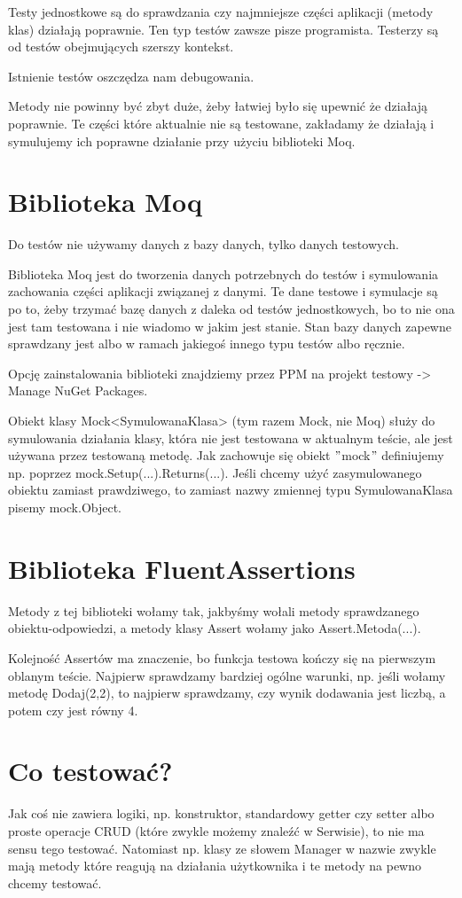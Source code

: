 \documentclass[10pt]{article}
\begin{document}
Testy jednostkowe są do sprawdzania czy najmniejsze części aplikacji (metody klas) działają poprawnie. Ten typ testów zawsze pisze programista. Testerzy są od testów obejmujących szerszy kontekst.

Istnienie testów oszczędza nam debugowania.

Metody nie powinny być zbyt duże, żeby łatwiej było się upewnić że działają poprawnie. Te części które aktualnie nie są testowane, zakładamy że działają i symulujemy ich poprawne działanie przy użyciu biblioteki Moq.

\section{Biblioteka Moq}
Do testów nie używamy danych z bazy danych, tylko danych testowych.

Biblioteka Moq jest do tworzenia danych potrzebnych do testów i symulowania zachowania części aplikacji związanej z danymi. Te dane testowe i symulacje są po to, żeby trzymać bazę danych z daleka od testów jednostkowych, bo to nie ona jest tam testowana i nie wiadomo w jakim jest stanie. Stan bazy danych zapewne sprawdzany jest albo w ramach jakiegoś innego typu testów albo ręcznie.

Opcję zainstalowania biblioteki znajdziemy przez PPM na projekt testowy -> Manage NuGet Packages.

Obiekt klasy Mock<SymulowanaKlasa> (tym razem Mock, nie Moq) służy do symulowania działania klasy, która nie jest testowana w aktualnym teście, ale jest używana przez testowaną metodę. Jak zachowuje się obiekt $"$mock$"$ definiujemy np. poprzez mock.Setup(...).Returns(...). Jeśli chcemy użyć zasymulowanego obiektu zamiast prawdziwego, to zamiast nazwy zmiennej typu SymulowanaKlasa pisemy mock.Object.

\section{Biblioteka FluentAssertions}
Metody z tej biblioteki wołamy tak, jakbyśmy wołali metody sprawdzanego obiektu-odpowiedzi, a metody klasy Assert wołamy jako Assert.Metoda(...).

Kolejność Assertów ma znaczenie, bo funkcja testowa kończy się na pierwszym oblanym teście. Najpierw sprawdzamy bardziej ogólne warunki, np. jeśli wołamy metodę Dodaj(2,2), to najpierw sprawdzamy, czy wynik dodawania jest liczbą, a potem czy jest równy 4.

\section{Co testować?}
Jak coś nie zawiera logiki, np. konstruktor, standardowy getter czy setter albo proste operacje CRUD (które zwykle możemy znaleźć w Serwisie), to nie ma sensu tego testować. Natomiast np. klasy ze słowem Manager w nazwie zwykle mają metody które reagują na działania użytkownika i te metody na pewno chcemy testować.
\end{document}

